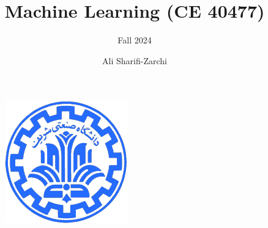 \documentclass[serif, aspectratio=169]{beamer}
\author{Ali Sharifi-Zarchi}
\title{Machine Learning (CE 40477)}
\subtitle{Fall 2024}
\institute{
    CE Department \\
    Sharif University of Technology
}
\begin{document}
\begin{frame}
    \titlepage
    \vspace*{-0.6cm}
    \begin{figure}[htpb]
        \begin{center}
            \includegraphics[keepaspectratio, scale=0.25]{pic/sharif-main-logo.png}
        \end{center}
    \end{figure}
\end{frame}

\begin{frame}    
\tableofcontents[sectionstyle=show,
subsectionstyle=show/shaded/hide,
subsubsectionstyle=show/shaded/hide]
\end{frame}
\end{document}
